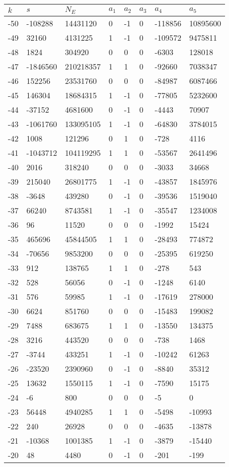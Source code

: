 \documentclass{amsart}
\begin{document}
\begin{longtable}{|l|l|l|lllll|}
\hline
$k$ & $s$ & $N_E$ & $a_1$ & $a_2$ & $a_3$ & $a_4$ & $a_5$\\
\hline
-50&-108288&14431120&0&-1&0&-118856&10895600\\
-49&32160&4131225&1&-1&0&-109572&9475811\\
-48&1824&304920&0&0&0&-6303&128018\\
-47&-1846560&210218357&1&1&0&-92660&7038347\\
-46&152256&23531760&0&0&0&-84987&6087466\\
-45&146304&18684315&1&-1&0&-77805&5232600\\
-44&-37152&4681600&0&-1&0&-4443&70907\\
-43&-1061760&133095105&1&-1&0&-64830&3784015\\
-42&1008&121296&0&1&0&-728&4116\\
-41&-1043712&104119295&1&1&0&-53567&2641496\\
-40&2016&318240&0&0&0&-3033&34668\\
-39&215040&26801775&1&-1&0&-43857&1845976\\
-38&-3648&439280&0&-1&0&-39536&1519040\\
-37&66240&8743581&1&-1&0&-35547&1234008\\
-36&96&11520&0&0&0&-1992&15424\\
-35&465696&45844505&1&1&0&-28493&774872\\
-34&-70656&9853200&0&0&0&-25395&619250\\
-33&912&138765&1&1&0&-278&543\\
-32&528&56056&0&-1&0&-1248&6140\\
-31&576&59985&1&-1&0&-17619&278000\\
-30&6624&851760&0&0&0&-15483&199082\\
-29&7488&683675&1&1&0&-13550&134375\\
-28&3216&443520&0&0&0&-738&1468\\
-27&-3744&433251&1&-1&0&-10242&61263\\
-26&-23520&2390960&0&-1&0&-8840&35312\\
-25&13632&1550115&1&-1&0&-7590&15175\\
-24&-6&800&0&0&0&-5&0\\
-23&56448&4940285&1&1&0&-5498&-10993\\
-22&240&26928&0&0&0&-4635&-13878\\
-21&-10368&1001385&1&-1&0&-3879&-15440\\
-20&48&4480&0&-1&0&-201&-199\\

\end{longtable}
\end{document}

